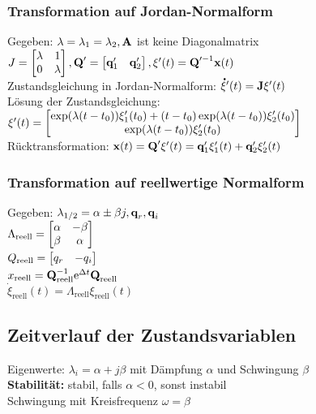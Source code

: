 \documentclass[fs, footer]{latex4ei}
\begin{document}
\begin{multicols*}{4}
    \subsubsection{Transformation auf Jordan-Normalform}
    Gegeben: $\lambda = \lambda_1 = \lambda_2, \textbf{A}$ ist keine Diagonalmatrix\\
    $J = \begin{bmatrix} \lambda & 1 \\ 0 & \lambda \end{bmatrix}, \textbf{Q}' = \begin{bmatrix} \textbf{q}_1' & \textbf{q}_2' \end{bmatrix}, \xi'(t) = \textbf{Q}'^{-1}\textbf{x}(t)$\\
    Zustandsgleichung in Jordan-Normalform: $\accentset{\mbox{\textrm{\large\bfseries .}} }{\xi} '(t) = \textbf{J} \xi '(t)$\\
    Lösung der Zustandsgleichung:\\ $\xi '(t) = \begin{bmatrix} \exp(\lambda(t-t_0))\xi_1'(t_0)+(t-t_0)\exp(\lambda(t-t_0))\xi_2'(t_0) \\ \exp(\lambda(t-t_0))\xi_2'(t_0)  \end{bmatrix}$\\
    Rücktransformation: $\textbf{x}(t) = \textbf{Q}'\xi '(t) = \textbf{q}_1'\xi_1'(t) + \textbf{q}_2'\xi_2'(t)$\\
    \subsubsection{Transformation auf reellwertige Normalform}
    Gegeben: $\lambda_{1/2} = \alpha \pm \beta j, \textbf{q}_r, \textbf{q}_i$\\
    $\Lambda_\text{reell} =  \begin{bmatrix} \alpha & - \beta \\ \beta & \alpha \end{bmatrix}$\\
    $Q_\text{reell} = \begin{bmatrix}  q_r & - q_i \end{bmatrix}$\\
    $x_\text{reell} = \textbf{Q}_\text{reell}^{-1} \mathrm{e}^{\Delta t}\textbf{Q}_\text{reell}$\\
    $\dot{\xi}_\text{reell} (t) = \Lambda_\text{reell}\xi_\text{reell}(t)$\\
    \subsection{Zeitverlauf der Zustandsvariablen}
    Eigenwerte: $\lambda_i = \alpha + j\beta$ mit Dämpfung $\alpha$ und Schwingung $\beta$\\
    \textbf{Stabilität:} stabil, falls $\alpha < 0$, sonst instabil\\
    Schwingung mit Kreisfrequenz $\omega = \beta$\\

\end{multicols*}
\end{document}
